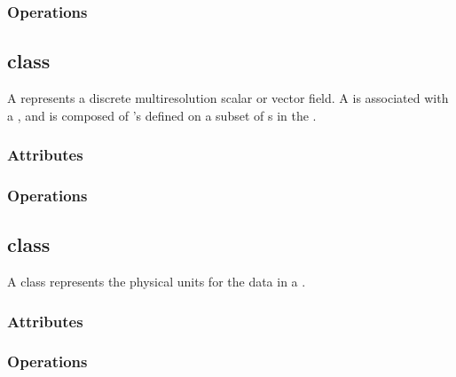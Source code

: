 \documentclass{article}
\begin{document}
\subsubsection{Operations}

\subsection{ class}

A  represents a discrete multiresolution scalar or vector
field.  A  is associated with a , and is
composed of 's defined on a subset of s in the
.

\subsubsection{Attributes}

\subsubsection{Operations}

\subsection{ class}

A  class represents the physical units for the data in a
.

\subsubsection{Attributes}

\subsubsection{Operations}

\end{document}
